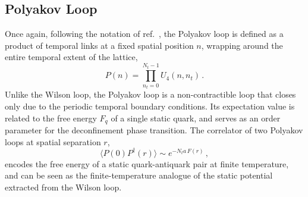 \documentclass[11pt]{article}
\newcommand{\sidefact}[1]{\marginnote{\footnotesize\textcolor{green!50!black}{#1}}}
\theoremstyle{definition}
\begin{document}
\subsection*{Polyakov Loop}
Once again, following the notation of ref.~\cite{gattringer2010qcd}, the Polyakov loop is 
defined as a product of temporal links at a fixed spatial position $n$, 
wrapping around the entire temporal extent of the lattice,
\begin{equation}
    P(n) = \prod_{n_t=0}^{N_t-1} U_4(n, n_t)\,.
\end{equation}
Unlike the Wilson loop, the Polyakov loop is a non-contractible\sidefact{Here non-contractible means that the loop cannot be continuously shrunk to a point.} loop that 
closes only due to the periodic temporal boundary conditions. Its expectation 
value is related to the free energy $F_q$ of a single static quark, and serves as 
an order parameter for the deconfinement phase transition. The correlator of 
two Polyakov loops at spatial separation $r$,
\begin{equation}
\langle P(0) P^{\dagger}(r) \rangle \sim e^{-N_t a \, F(r)}\,,
\end{equation}
encodes the free energy of a static quark-antiquark pair at finite temperature, 
and can be seen as the finite-temperature analogue of the static potential 
extracted from the Wilson loop.



\end{document}
